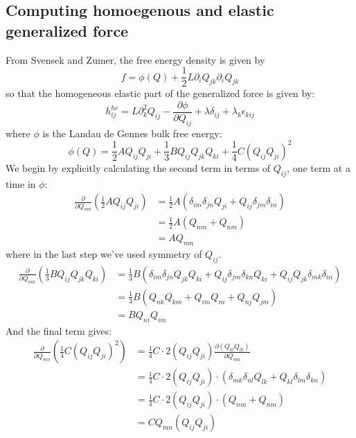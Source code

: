 \documentclass[reqno]{article}
\begin{document}
	\subsection{Computing homoegenous and elastic generalized force}
	From Svensek and Zumer, the free energy density is given by
	\begin{equation}
		f = \phi(Q) + \frac{1}{2} L \partial_i Q_{jk} \partial_i Q_{jk}
	\end{equation}
	so that the homogeneous elastic part of the generalized force is given by:
	\begin{equation}
		h^{he}_{ij} = L\partial_k^2 Q_{ij} - \frac{\partial \phi}{\partial Q_{ij}} + \lambda \delta_{ij} + \lambda_k\epsilon_{kij}
	\end{equation}
	where $\phi$ is the Landau de Gennes bulk free energy:
	\begin{equation}
		\phi(Q) = \frac{1}{2}A Q_{ij}Q_{ji} + \frac{1}{3}B Q_{ij}Q_{jk}Q_{ki} + \frac{1}{4} C(Q_{ij}Q_{ji})^2
	\end{equation}
	We begin by explicitly calculating the second term in terms of $Q_{ij}$, one term at a time in $\phi$:
	\begin{equation}
	\begin{split}
		\frac{\partial}{\partial Q_{mn}}\left(\frac{1}{2}AQ_{ij}Q_{ji}\right) &= \frac{1}{2}A \left(\delta_{im}\delta_{jn}Q_{ji} + Q_{ij}\delta_{jm}\delta_{in}\right) \\
		&= \frac{1}{2}A (Q_{nm} + Q_{nm}) \\
		&= A Q_{mn}
	\end{split}
	\end{equation}
	where in the last step we've used symmetry of $Q_{ij}$.
	\begin{equation}
	\begin{split}
		\frac{\partial}{\partial Q_{mn}} \left( \frac{1}{3}BQ_{ij}Q_{jk}Q_{ki} \right) &= \frac{1}{3}B ( \delta_{im}\delta_{jn}Q_{jk}Q_{ki} + Q_{ij}\delta_{jm}\delta_{kn}Q_{ki} + Q_{ij}Q_{jk}\delta_{mk}\delta_{ni} ) \\
		&= \frac{1}{3}B(Q_{nk}Q_{km} + Q_{im}Q_{ni} + Q_{nj}Q_{jm}) \\
		&= BQ_{ni}Q_{im}
	\end{split}
	\end{equation}
	And the final term gives:
	\begin{equation}
	\begin{split}
		\frac{\partial}{\partial Q_{mn}}\left( \frac{1}{4} C(Q_{ij}Q_{ji})^2 \right) &= \frac{1}{4}C \cdot 2(Q_{ij}Q_{ji}) \frac{\partial(Q_{kl}Q_{lk})}{\partial Q_{mn}} \\
		&= \frac{1}{4}C \cdot 2(Q_{ij}Q_{ji}) \cdot (\delta_{mk}\delta_{nl}Q_{lk} + Q_{kl}\delta_{lm}\delta_{kn}) \\
		&= \frac{1}{4}C \cdot 2(Q_{ij}Q_{ji}) \cdot (Q_{nm} + Q_{nm}) \\
		&= C Q_{mn} (Q_{ij}Q_{ji})
	\end{split}
	\end{equation}
\end{document}
